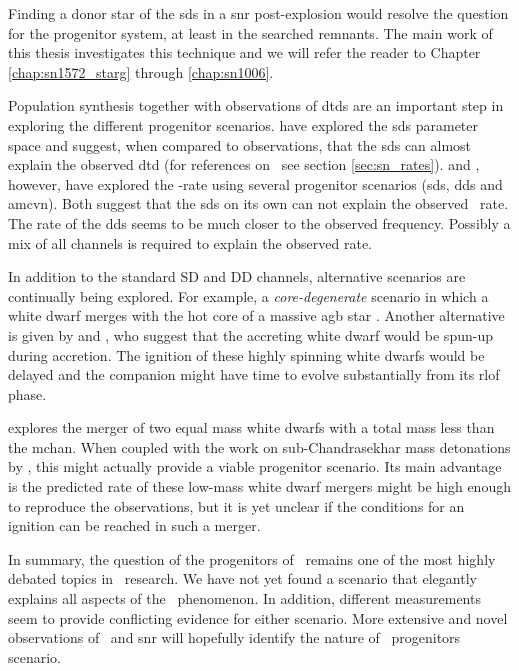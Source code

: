 Finding a donor star of the \gls{sds} in a \gls{snr} post-explosion would resolve the question for the progenitor system, at least in the searched remnants. The main work of this thesis investigates this technique and we will refer the reader to Chapter \ref{chap:sn1572_starg} through \ref{chap:sn1006}. 

Population synthesis together with observations of \glspl{dtd} are an important step in exploring the different progenitor scenarios. \citet{2008ApJ...683L.127H, Han:2004p444}  have explored the \gls{sds} parameter space and suggest, when compared to observations, that the \gls{sds} can almost explain the observed \gls{dtd} (for references on \dtd\ see section \ref{sec:sn_rates}). \citet{2009ApJ...699.2026R} and \citet{2010A&A...515A..89M}, however, have explored the \snia-rate using several progenitor scenarios (\gls{sds}, \gls{dds} and \gls{amcvn}). Both suggest that the \gls{sds} on its own can not explain the observed \sneia\ rate. The rate of the \gls{dds} seems to be much closer to the observed frequency. Possibly a mix of all channels is required to explain the observed rate. 


In addition to the standard SD and DD channels, alternative scenarios are continually being explored. For example, a \emph{core-degenerate} scenario in which a white dwarf merges with the hot core of a massive \gls{agb} star \citep{2011arXiv1106.2027I}. Another alternative is given by \citet{2011arXiv1102.4342D} and \citet{2011ApJ...730L..34J}, who suggest that the accreting white dwarf would be spun-up during accretion. The ignition of these highly spinning white dwarfs would be delayed and the companion might have time to evolve  substantially from its \gls{rlof} phase. 

\citet{2010ApJ...722L.157V} explores the merger of two equal mass white dwarfs with a total mass less than the \gls{mchan}. When coupled with the work on sub-Chandrasekhar mass detonations by \citet{2010ApJ...714L..52S}, this might actually provide a viable progenitor scenario. Its main advantage is the predicted rate of these low-mass white dwarf mergers might be high enough to reproduce the observations, but it is yet unclear if the conditions for an ignition can be reached in such a merger. 

In summary, the question of the progenitors of \sneia\ remains one of the most highly debated topics in \sneia\ research. We have not yet found a scenario that elegantly explains all aspects of the \snia\ phenomenon. In addition, different measurements seem to provide conflicting evidence for either scenario. More extensive and novel observations of \sneia\ and \gls{snr} will hopefully identify the nature of \snia\ progenitors scenario.



